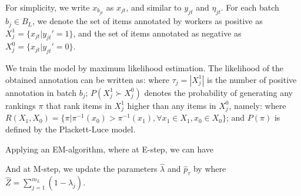 For simplicity, we write $x_{b_{jt}}$ as $x_{jt}$, and similar to $y_{jt}$ and $\eta_{jt}$.
For each batch $b_j \in B_L$, we denote the set of items annotated by workers as positive as $X_{j}^1 = \{x_{jt} | y_{jt}' = 1\}$, 
and the set of items annotated as negative as $X_{j}^0 = \{x_{jt} | y_{jt}' = 0\}$.  


We train the model by maximum likelihood estimation.  
The likelihood of the obtained annotation can be written as:
%
where $\tau_j = |X_{j}^1|$ is the number of positive annotation in batch $b_j$;
$P(X_{j}^1 \succ X_{j}^0)$ denotes the probability of generating any rankings $\pi$
that rank items in $X_{j}^1$ higher than any items in $X_{j}^0$, 
namely:
%
where $R(X_1, X_0) = \{ \pi |\pi^{-1}(x_{0}) > \pi^{-1}(x_{1}),  \forall x_{1} \in X_1, x_0 \in X_0 \}$;
and $P(\pi)$ is defined by the Plackett-Luce model.  

Applying an EM-algorithm, where at E-step, we can have 

And at M-step, we update the parameters $\hat{\lambda}$ and $\hat{p}_{\tau}$ by
%
where $\hat{Z} = \sum_{j=1}^{m_L} (1 - \hat{\lambda}_j)$.  



